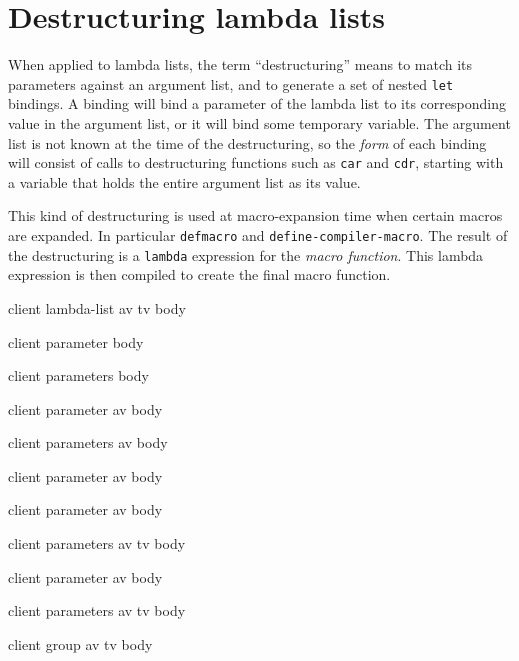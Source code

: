 \chapter{Destructuring lambda lists}
\label{chap-destructuring-lambda-lists}

When applied to lambda lists, the term ``destructuring'' means to
match its parameters against an argument list, and to generate a set
of nested \texttt{let} bindings.  A binding will bind a parameter of
the lambda list to its corresponding value in the argument list, or it
will bind some temporary variable.  The argument list is not known at
the time of the destructuring, so the \emph{form} of each binding will
consist of calls to destructuring functions such as \texttt{car} and
\texttt{cdr}, starting with a variable that holds the entire argument
list as its value.

This kind of destructuring is used at macro-expansion time when
certain macros are expanded.  In particular \texttt{defmacro} and
\texttt{define-compiler-macro}.  The result of the destructuring is a
\texttt{lambda} expression for the \emph{macro function}.  This lambda
expression is then compiled to create the final macro function.

 {client lambda-list av tv body}

 {client parameter body}

 {client parameters body}

 {client parameter av body}

 {client parameters av body}

 {client parameter av body}

 {client parameter av body}

 {client parameters av tv body}

 {client parameter av body}

 {client parameters av tv body}

 {client group av tv body}

